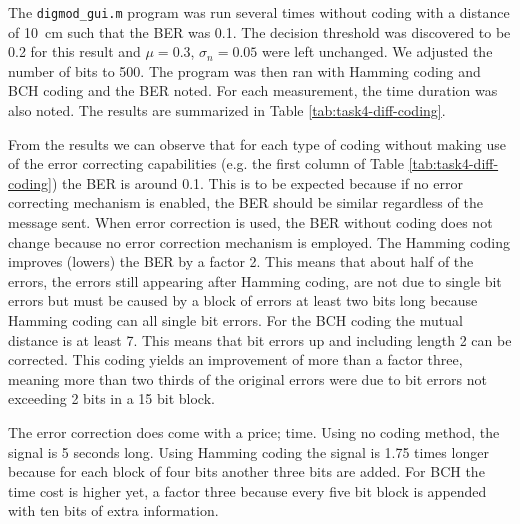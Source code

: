 \documentclass[11pt,titlepage]{report}
\begin{document}
The \texttt{digmod\_gui.m} program was run several times without coding with a distance of \SI{10}{\centi \meter} such that the BER was \num{0.1}. The decision threshold was discovered to be \num{0.2} for this result and $\mu=0.3$, $\sigma_n=0.05$ were left unchanged. We adjusted the number of bits to \num{500}. The program was then ran with Hamming coding and BCH coding and the BER noted. For each measurement, the time duration was also noted. The results are summarized in Table \ref{tab:task4-diff-coding}.

From the results we can observe that for each type of coding without making use of the error correcting capabilities (e.g. the first column of Table \ref{tab:task4-diff-coding}) the BER is around \num{0.1}. This is to be expected because if no error correcting mechanism is enabled, the BER should be similar regardless of the message sent. When error correction is used, the BER without coding does not change because no error correction mechanism is employed. The Hamming coding improves (lowers) the BER by a factor \num{2}. This means that about half of the errors, the errors still appearing after Hamming coding, are not due to single bit errors but must be caused by a block of errors at least two bits long because Hamming coding can all single bit errors.
For the BCH coding the mutual distance is at least \num{7}. This means that bit errors up and including length \num{2} can be corrected. This coding yields an improvement of more than a factor three, meaning more than two thirds of the original errors were due to bit errors not exceeding \num{2} bits in a \num{15} bit block.

The error correction does come with a price; time. Using no coding method, the signal is \num{5} seconds long. Using Hamming coding the signal is \num{1.75} times longer because for each block of four bits another three bits are added. For BCH the time cost is higher yet, a factor three because every five bit block is appended with ten bits of extra information.
\end{document}
